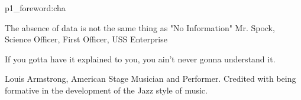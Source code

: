 \begin{chapterpage}{}{p1_foreword:cha}

\begin{myquotation}\large

The absence of data is not the same thing as "No Information"  \newline 
Mr. Spock, Science Officer, First Officer, USS Enterprise

\end{myquotation}
\vspace{2cm}
\begin{myquotation}\large

If you gotta have it explained to you, you ain't never gonna understand it.\newline

Louis Armstrong, American Stage Musician and Performer. Credited with being formative in the development of the Jazz style of music.

\end{myquotation}
\vspace{2cm}
\end{chapterpage}

